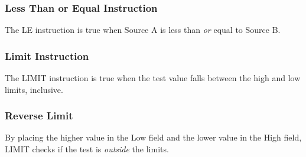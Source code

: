 \begin{frame}
    \frametitle{Less Than or Equal Instruction}

    \begin{figure}
        \centering
        \resizebox{0.625\linewidth}{!}{
            
        }

        \resizebox{0.625\linewidth}{!}{
            
        }

        \resizebox{0.625\linewidth}{!}{
        
        }
    \end{figure}

    \vspace{0.5em}
    \centering
    {\footnotesize The LE instruction is true when Source A is less than \emph{or} equal to Source B.\par}
\end{frame}

\begin{frame}
    \frametitle{Limit Instruction}

    \begin{figure}
        \centering
        \resizebox{0.5\linewidth}{!}{
            
        }
        
        \resizebox{0.5\linewidth}{!}{
            
        }
        
        \resizebox{0.5\linewidth}{!}{
            
        }
    \end{figure}

    \vspace{0.5em}
    \centering
    {\footnotesize The LIMIT instruction is true when the test value falls between the high and low limits, inclusive.\par}
\end{frame}

\begin{frame}
    \frametitle{Reverse Limit}

    \begin{figure}
        \centering
        \resizebox{0.625\linewidth}{!}{
            
        }
        
        \resizebox{0.625\linewidth}{!}{
            
        }
    \end{figure}

    \vspace{0.5em}
    \centering
    {\footnotesize By placing the higher value in the Low field and the lower value in the High field, LIMIT checks if the test is \emph{outside} the limits.\par}
\end{frame}

